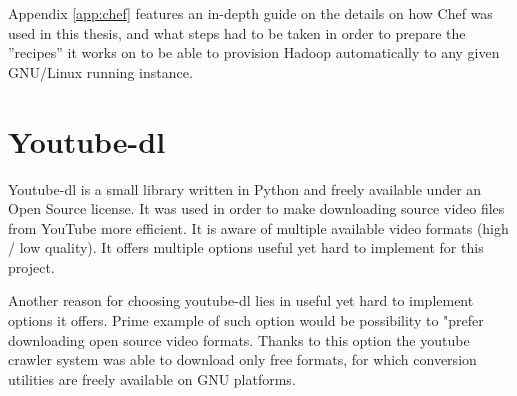 Appendix \ref{app:chef} features an in-depth guide on the details on how Chef was used in this thesis, and what steps had to be taken in order to prepare the ''recipes'' it works on to be able to provision Hadoop automatically to any given GNU/Linux running instance.


\section{Youtube-dl}
Youtube-dl \cite{youtube-dl} is a small library written in Python and freely available under an Open Source license. 
It was used in order to make downloading source video files from YouTube more efficient. It is aware of multiple available video formats (high / low quality). It offers multiple options useful yet hard to implement for this project.

Another reason for choosing youtube-dl lies in useful yet hard to implement options it offers. Prime example of such option would be possibility to "prefer downloading open source video formats. Thanks to this option the youtube crawler system was able to download only free formats, for which conversion utilities are freely available on GNU platforms.

%
%











